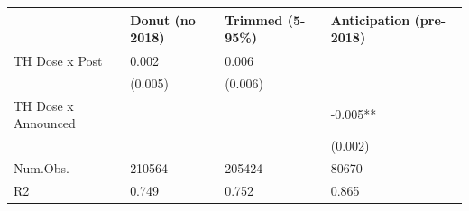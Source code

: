 \begin{tabular}{llll}
\hline
& Donut
(no 2018) & Trimmed
(5-95\%) & Anticipation
(pre-2018) \\ \hline
TH Dose x Post & 0.002 & 0.006 &  \\
& (0.005) & (0.006) &  \\
TH Dose x Announced &  &  & -0.005** \\
&  &  & (0.002) \\
Num.Obs. & 210564 & 205424 & 80670 \\
R2 & 0.749 & 0.752 & 0.865 \\
\hline
\end{tabular}
